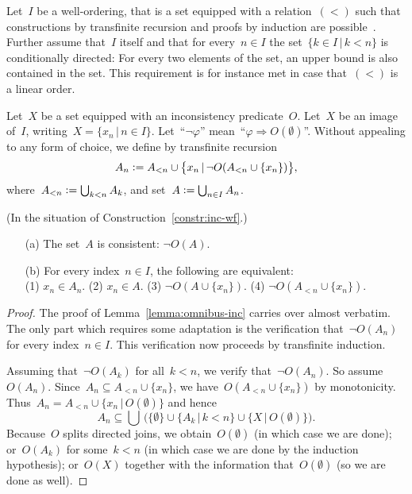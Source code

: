 \documentclass[envcountsect,envcountsame,runningheads]{llncs}
\newcommand{\defeq}{\vcentcolon=}
\renewcommand{\_}{\mathpunct{.}\,}
\begin{document}
Let~$I$ be a well-ordering, that is a set equipped with a relation~$({<})$ such
that constructions by transfinite recursion and proofs by induction are
possible~\cite{XXX}. Further assume that~$I$ itself and that for every~$n \in
I$ the set~$\{ k \in I \,|\, k < n \}$ is conditionally directed: For every two
elements of the set, an upper bound is also contained in the set. This
requirement is for instance met in case that~$({<})$ is a linear order.

\begin{construction}\label{constr:inc-wf}Let~$X$ be a set equipped with
an inconsistency predicate~$O$. Let~$X$ be an image of~$I$, writing~$X = \{ x_n
\,|\, n \in I \}$. Let~``$\neg\varphi$'' mean~``$\varphi \Rightarrow
O(\emptyset)$''. Without appealing to any form of choice, we define by
transfinite recursion
\[ A_n \defeq A_{<n} \cup \bigl\{ x_n \,|\, \neg O(A_{<n}\cup\{x_n\}) \bigr\}, \]
where~$A_{<n} \defeq \bigcup_{k < n} A_k$, and set~$A \defeq \bigcup_{n \in I} A_n$.
\end{construction}

\begin{lemma}\label{lemma:omnibus-inc-wf}(In the situation of
Construction~\ref{constr:inc-wf}.)
\begin{enumerate}
\item[(a)] The set~$A$ is consistent: $\neg O(A)$.
\item[(b)] For every index~$n \in I$, the following are equivalent: \\
(1) $x_n \in A_n$. \quad
(2) $x_n \in A$. \quad
(3) $\neg O(A\cup\{x_n\})$. \quad
(4) $\neg O(A_{<n} \cup \{x_n\})$.
\end{enumerate}\end{lemma}

\begin{proof}The proof of Lemma~\ref{lemma:omnibus-inc} carries over almost
verbatim. The only part which requires some adaptation is the verification
that~$\neg O(A_n)$ for every index~$n \in I$. This verification now proceeds by
transfinite induction.

Assuming that~$\neg O(A_k)$ for all~$k < n$, we verify that~$\neg O(A_n)$. So
assume~$O(A_n)$. Since~$A_n \subseteq A_{<n} \cup \{x_n\}$, we have~$O(A_{<n}
\cup \{x_n\})$ by monotonicity. Thus~$A_n = A_{<n} \cup
\{x_n\,|\,O(\emptyset)\}$ and hence
\[ A_n \subseteq \bigcup\,\bigl(\{ \emptyset \} \cup \{ A_k \,|\, k < n \} \cup
\{ X \,|\, O(\emptyset) \}\bigr). \]
Because~$O$ splits directed joins, we obtain~$O(\emptyset)$ (in which case we
are done); or~$O(A_k)$ for some~$k < n$ (in which case we are done by the
induction hypothesis); or~$O(X)$ together with the information
that~$O(\emptyset)$ (so we are done as well).
\end{proof}
\end{document}
